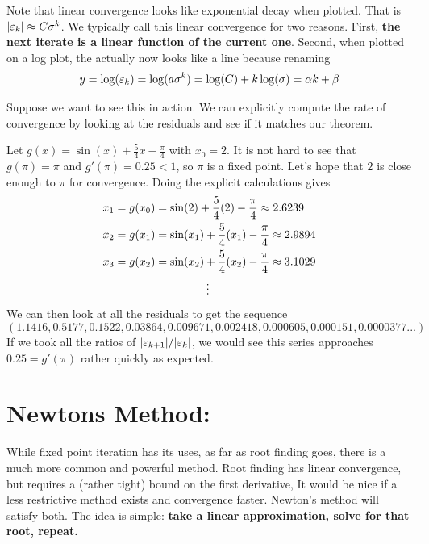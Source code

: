 \documentclass[11pt]{article}
\begin{document}
\begin{remark}{}{}
    Note that linear convergence looks like exponential decay when plotted. That is $|\varepsilon_k| \approx C\sigma^k$. We typically call this linear convergence for two reasons. First, \textbf{the next iterate is a linear function of the current one}. Second, when plotted on a log plot, the actually now looks like a line because renaming $$y = \log(\varepsilon_k) = \log(a\sigma^k) = \log(C)+ k\log(\sigma) = \alpha k + \beta$$
\end{remark}


Suppose we want to see this in action. We can explicitly compute the rate of convergence by looking at the residuals and see if it matches our theorem. 
\begin{example}{}{}
    Let $g(x) =\sin\left(x\right)+\frac{5}{4}x-\frac{\pi}{4}$ with $x_0 = 2$. It is not hard to see that $g(\pi) = \pi$ and $g'(\pi) = 0.25 < 1$, so $\pi$ is a fixed point. Let's hope that $2$ is close enough to $\pi$ for convergence. Doing the explicit calculations gives \begin{align*}
        x_1 = g(x_0) &= \sin(2) + \frac{5}{4}(2) - \frac{\pi}{4} \approx 2.6239\\
         x_2 = g(x_1) &= \sin(x_1)+\frac{5}{4}(x_1)-\frac{\pi}{4} \approx 2.9894\\
           x_3 = g(x_2) &= \sin(x_2)+\frac{5}{4}(x_2)-\frac{\pi}{4} \approx 3.1029\\
           & \hspace{1.6cm}\vdots
    \end{align*} 
    We can then look at all the residuals to get the sequence $$ (1.1416, 0.5177, 0.1522, 0.03864, 0.009671, 0.002418, 0.000605, 0.000151, 0.0000377...)$$
    If we took all the ratios of $|\varepsilon_{k+1}|/|\varepsilon_k|$, we would see this series approaches $0.25 = g'(\pi)$ rather quickly as expected.
\end{example}

\section{Newtons Method:}
While fixed point iteration has its uses, as far as root finding goes, there is a much more common and powerful method. Root finding has linear convergence, but requires a (rather tight) bound on the first derivative, It would be nice if a less restrictive method exists and convergence faster. Newton's method will satisfy both. The idea is simple: \textbf{take a linear approximation, solve for that root, repeat.}
\end{document}
